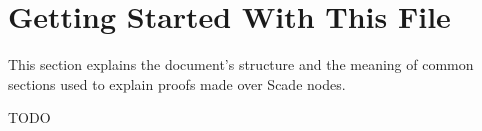 \section{Getting Started With This File}
This section explains the document's structure and the meaning of
common sections used to explain proofs made over Scade nodes.

TODO
